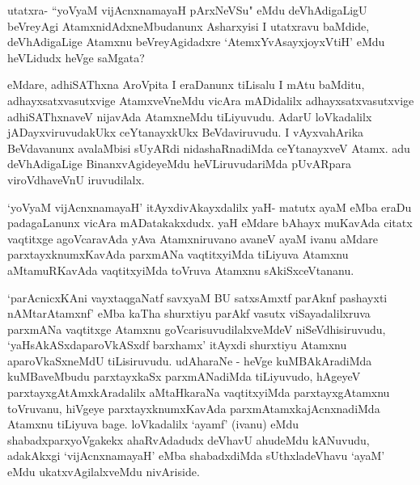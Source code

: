 \begin{artha}
utatxra- ``yoV\s yaM vijAcnxnamayaH pArxNeVSu" eMdu deVhAdigaLigU beVreyAgi AtamxnidAdxneMbudanunx Asharxyisi I utatxravu baMdide, deVhAdigaLige Atamxnu beVreyAgidadxre `AtemxYvAsayxjoyxVtiH' eMdu heVLidudx heVge saMgata?
\end{artha}

\begin{artha}%
eMdare, adhiSAThxna AroVpita I eraDanunx tiLisalu I mAtu baMditu, adhayxsatxvasutxvige AtamxveVneMdu vicAra mADidalilx adhayxsatxvasutxvige adhiSAThxnaveV nijavAda AtamxneMdu tiLiyuvudu. AdarU loVkadalilx jADayxviruvudakUkx ceYtanayxkUkx BeVdaviruvudu. I vAyxvahArika BeVdavanunx avalaMbisi sUyARdi nidashaRnadiMda ceYtanayxveV Atamx. adu deVhAdigaLige BinanxvAgideyeMdu heVLiruvudariMda pUvARpara viroVdhaveVnU iruvudilalx. 
\end{artha}

\begin{artha}
`yoV\s yaM vijAcnxnamayaH' itAyxdivAkayxdalilx yaH- matutx ayaM eMba eraDu padagaLanunx vicAra mADatakakxdudx. yaH eMdare bAhayx muKavAda citatx vaqtitxge agoVcaravAda yAva Atamxniruvano avaneV ayaM ivanu aMdare parxtayxknumxKavAda parxmANa vaqtitxyiMda tiLiyuva Atamxnu aMtamuRKavAda vaqtitxyiMda toVruva Atamxnu sAkiSxceVtananu. 
\end{artha}

\begin{artha}
`parAcnicxKAni vayxtaqgaNatf savxyaM BU satxsAmxtf parAknf pashayxti nAMtarAtamxnf' eMba kaTha shurxtiyu parAkf vasutx viSayadalilxruva parxmANa vaqtitxge Atamxnu goVcarisuvudilalxveMdeV niSeVdhisiruvudu, `yaHsAkASxdaparoVkASxdf barxhamx' itAyxdi shurxtiyu Atamxnu aparoVkaSxneMdU tiLisiruvudu. udAharaNe - heVge kuMBAkAradiMda kuMBaveMbudu parxtayxkaSx parxmANadiMda tiLiyuvudo, hAgeyeV parxtayxgAtAmxkAradalilx aMtaHkaraNa vaqtitxyiMda parxtayxgAtamxnu toVruvanu, hiVgeye parxtayxknumxKavAda parxmAtamxkajAcnxnadiMda Atamxnu tiLiyuva bage. loVkadalilx `ayamf' (ivanu) eMdu shabadxparxyoVgakekx ahaRvAdadudx deVhavU ahudeMdu kANuvudu, adakAkxgi `vijAcnxnamayaH' eMba shabadxdiMda sUthxladeVhavu `ayaM' eMdu ukatxvAgilalxveMdu nivAriside.
\end{artha}



